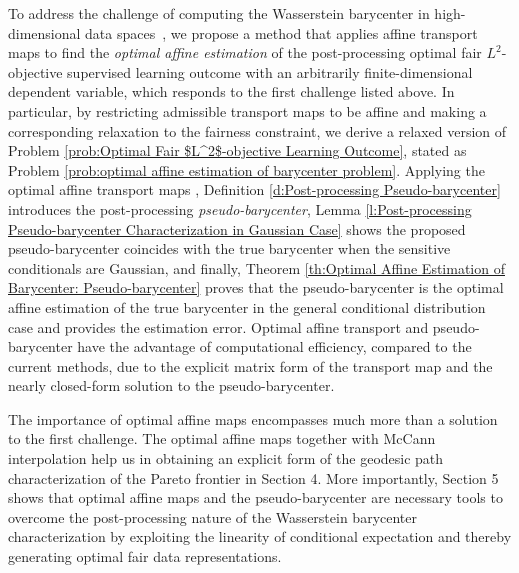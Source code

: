 \documentclass[twoside,11pt]{article}
\begin{document}
\begin{enumerate}
To address the challenge of computing the Wasserstein barycenter in high-dimensional data spaces~\cite{altschuler2022wasserstein}, we propose a method that applies affine transport maps to find the {\em optimal affine estimation} of the post-processing optimal fair $L^2$-objective supervised learning outcome with an arbitrarily finite-dimensional dependent variable, which responds to the first challenge listed above. In particular, by restricting admissible transport maps to be affine and making a corresponding relaxation to the fairness constraint, we derive a relaxed version of Problem \ref{prob:Optimal Fair $L^2$-objective Learning Outcome}, stated as Problem \ref{prob:optimal affine estimation of barycenter problem}. Applying the optimal affine transport maps \cite{agueh2011barycenters}, Definition \ref{d:Post-processing Pseudo-barycenter} introduces the post-processing {\em pseudo-barycenter}, Lemma \ref{l:Post-processing Pseudo-barycenter Characterization in Gaussian Case} shows the proposed pseudo-barycenter coincides with the true barycenter when the sensitive conditionals are Gaussian, and finally, Theorem \ref{th:Optimal Affine Estimation of Barycenter: Pseudo-barycenter} proves that the pseudo-barycenter is the optimal affine estimation of the true barycenter in the general conditional distribution case and provides the estimation error. Optimal affine transport and pseudo-barycenter have the advantage of computational efficiency, compared to the current methods, due to the explicit matrix form of the transport map and the nearly closed-form solution to the pseudo-barycenter. 

The importance of optimal affine maps encompasses much more than a solution to the first challenge. The optimal affine maps together with McCann interpolation \cite{mccann1997convexity} help us in obtaining an explicit form of the geodesic path characterization of the Pareto frontier in Section 4. More importantly, Section 5 shows that optimal affine maps and the pseudo-barycenter are necessary tools to overcome the post-processing nature of the Wasserstein barycenter characterization by exploiting the linearity of conditional expectation and thereby generating optimal fair data representations. 


\end{enumerate}
\end{document}
